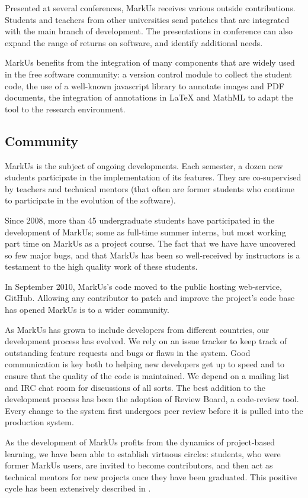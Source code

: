 \documentclass[twocolumn,10pt]{asme2e}
\begin{document}
Presented at several conferences, MarkUs receives various outside contributions. Students and teachers from other universities send patches that are integrated with the main branch of development. The presentations in conference can also expand the range of returns on software, and identify additional needs.

MarkUs benefits from the integration of many components that are widely used in the free software community: a version control module to collect the student code, the use of a well-known javascript library to annotate images and PDF documents, the integration of annotations in LaTeX and MathML to adapt the tool to the research environment. 

\subsection*{Community}
MarkUs is the subject of ongoing developments. Each semester, a dozen  new students participate in the implementation of its features. They are co-supervised by teachers and technical mentors (that often are former students who continue to participate in the evolution of the software).

Since 2008, more than 45 undergraduate students have participated in the development of MarkUs; some as full-time summer interns, but most working part time on MarkUs as a project course. The fact that we have have uncovered so few major bugs, and that MarkUs has been so well-received by instructors is a testament to the high quality work of these students.

In September 2010, MarkUs's code moved to the public hosting web-service,
GitHub. Allowing any contributor to patch and improve the project's code base has opened MarkUs is to a wider community.

As MarkUs has grown to include developers from different countries, our development process has evolved. We rely on an issue tracker to keep track of outstanding feature requests and bugs or flaws in the system. Good communication is key both to helping new developers get up to speed and to ensure that the quality of the code is maintained.  We depend on a mailing list and IRC chat room for discussions of all sorts. The best addition to the development process has been the adoption of Review Board\cite{reviewboard}, a code-review tool. Every change to the system first undergoes peer review before it is pulled into the production system.

As the development of MarkUs profits from the dynamics of project-based learning, we have been able to establish virtuous circles: students, who were former MarkUs users, are invited to become contributors, and then act as technical mentors for new projects once they have been graduated. This positive cycle has been extensively described in \cite{magnin-qpes-2011}.
\end{document}

